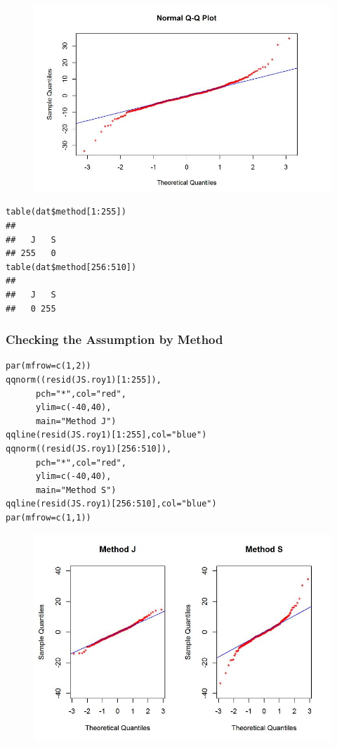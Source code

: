 \documentclass[a4paper,12pt]{article}
\begin{document}
\begin{figure}[h!]
	\centering
	\includegraphics[width=0.7\linewidth]{images/Resid-newplot}
	\caption{}
	\label{fig:Resid-newplot}
\end{figure}

\begin{framed}
\begin{verbatim}
table(dat$method[1:255])
## 
##   J   S 
## 255   0
table(dat$method[256:510])
## 
##   J   S 
##   0 255
\end{verbatim}	
\end{framed}



\newpage

\subsubsection{Checking the Assumption by Method}

\begin{framed}
\begin{verbatim}
par(mfrow=c(1,2))
qqnorm((resid(JS.roy1)[1:255]),
      pch="*",col="red",
      ylim=c(-40,40),
      main="Method J")
qqline(resid(JS.roy1)[1:255],col="blue")
qqnorm((resid(JS.roy1)[256:510]),
      pch="*",col="red",
      ylim=c(-40,40),
      main="Method S")
qqline(resid(JS.roy1)[256:510],col="blue")
par(mfrow=c(1,1))
\end{verbatim}	
\end{framed}


\begin{figure}[h!]
	\centering
	\includegraphics[width=1.1\linewidth]{images/Resid-newplot2}
	\caption{}
	\label{fig:Resid-newplot2}
\end{figure}
\end{document}
